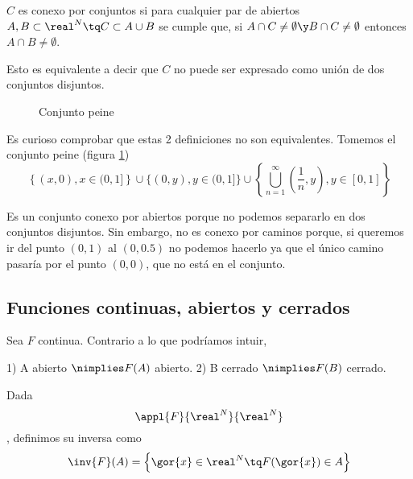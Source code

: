 \documentclass{apuntes}
\begin{document}
\begin{defn}
$C$ es conexo por conjuntos si para cualquier par de abiertos $A,B \subset \real^N \tq C\subset A\cup B$ se cumple que, si $A\cap C\neq \emptyset \y B\cap C \neq \emptyset $ entonces $ A\cap B \neq \emptyset$.

Esto es equivalente a decir que $C$ no puede ser expresado como unión de dos conjuntos disjuntos.
\end{defn}


\begin{remark}

\begin{figure}[hbtp]
\label{imgPeine}
\begin{center}
\caption{Conjunto peine}
\end{center}
\end{figure}

Es curioso comprobar que estas 2 definiciones no son equivalentes. Tomemos el conjunto peine (figura \ref{imgPeine})
\[ \left\{(x,0), x\in (0,1]\right\} \cup \{(0,y), y \in (0,1]\} \cup \left\{\bigcup_{n=1}^{\infty}{\left(\frac{1}{n},y\right), y \in [0,1]}\right\} \]

Es un conjunto conexo por abiertos porque no podemos separarlo en dos conjuntos disjuntos. Sin embargo, no es conexo por caminos porque, si queremos ir del punto $(0,1)$ al $(0,0.5)$ no podemos hacerlo ya que el único camino pasaría por el punto $(0,0)$, que no está en el conjunto.
\end{remark}

\subsection{Funciones continuas, abiertos y cerrados}
Sea $F$ continua. Contrario a lo que podríamos intuir, 

1) A abierto $\nimplies F(A)$ abierto.
2) B cerrado $\nimplies F(B)$ cerrado.

\begin{defn} Dada \[\appl{F}{\real^N}{\real^N}\], definimos su inversa como
\[ \inv{F}(A) = \left\{\gor{x}\in \real^N \tq F(\gor{x})\in A\right\} \]
\end{defn}
\end{document}
